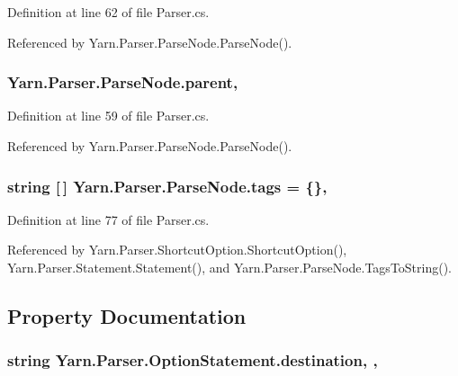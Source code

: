 Definition at line 62 of file Parser.\-cs.



Referenced by Yarn.\-Parser.\-Parse\-Node.\-Parse\-Node().

\hypertarget{a00148_af313a82103fcc2ff5a177dbb06b92f7b}{
\subsubsection[{parent}]{ Yarn.\-Parser.\-Parse\-Node.\-parent\hspace{0.3cm}{\ttfamily [package]}, {\ttfamily [inherited]}}}\label{a00148_af313a82103fcc2ff5a177dbb06b92f7b}


Definition at line 59 of file Parser.\-cs.



Referenced by Yarn.\-Parser.\-Parse\-Node.\-Parse\-Node().

\hypertarget{a00148_a58b3a15788fd2d4127d73619dc6d04ae}{
\subsubsection[{tags}]{\setlength{\rightskip}{0pt plus 5cm}string \mbox{[}$\,$\mbox{]} Yarn.\-Parser.\-Parse\-Node.\-tags = \{\}\hspace{0.3cm}{\ttfamily [package]}, {\ttfamily [inherited]}}}\label{a00148_a58b3a15788fd2d4127d73619dc6d04ae}


Definition at line 77 of file Parser.\-cs.



Referenced by Yarn.\-Parser.\-Shortcut\-Option.\-Shortcut\-Option(), Yarn.\-Parser.\-Statement.\-Statement(), and Yarn.\-Parser.\-Parse\-Node.\-Tags\-To\-String().



\subsection{Property Documentation}
\hypertarget{a00146_abbe56fba06169901508e6c659f06c236}{
\subsubsection[{destination}]{\setlength{\rightskip}{0pt plus 5cm}string Yarn.\-Parser.\-Option\-Statement.\-destination\hspace{0.3cm}{\ttfamily [get]}, {\ttfamily [set]}, {\ttfamily [package]}}}\label{a00146_abbe56fba06169901508e6c659f06c236}


